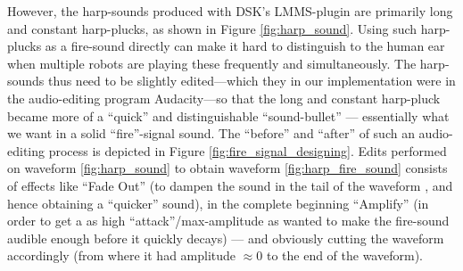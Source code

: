 			However, the harp-sounds produced with DSK's LMMS-plugin are primarily long and constant harp-plucks, as shown in Figure \ref{fig:harp_sound}. Using such harp-plucks as a fire-sound directly can make it hard to distinguish to the human ear when multiple robots are playing these frequently and simultaneously. The harp-sounds thus need to be slightly edited—which they in our implementation were in the audio-editing program Audacity—so that the long and constant harp-pluck became more of a ``quick'' and distinguishable ``sound-bullet'' — essentially what we want in a solid ``fire''-signal sound. The ``before'' and ``after'' of such an audio-editing process is depicted in Figure \ref{fig:fire_signal_designing}. Edits performed on waveform \ref{fig:harp_sound} to obtain waveform \ref{fig:harp_fire_sound} consists of effects like ``Fade Out'' (to dampen the sound in the tail of the waveform , and hence obtaining a ``quicker'' sound), in the complete beginning ``Amplify'' (in order to get a as high ``attack''/max-amplitude as wanted to make the fire-sound audible enough before it quickly decays) — and obviously cutting the waveform accordingly (from where it had amplitude $\approx 0$ to the end of the waveform).
			
